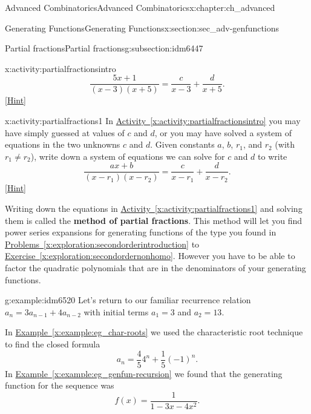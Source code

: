 \documentclass[oneside,10pt,]{book}
\newcommand{\terminology}[1]{\textbf{#1}}
\numberwithin{equation}{chapter}
\begin{document}
\begin{chapterptx}{Advanced Combinatorics}{}{Advanced Combinatorics}{}{}{x:chapter:ch_advanced}
\begin{sectionptx}{Generating Functions}{}{Generating Functions}{}{}{x:section:sec_adv-genfunctions}
\begin{subsectionptx}{Partial fractions}{}{Partial fractions}{}{}{g:subsection:idm6447}
\begin{activity}{}{x:activity:partialfractionsintro}
\begin{equation*}
\frac{5x+1}{(x-3)(x+5)} = \frac{c}{x-3} + \frac{d}{x+5}.
\end{equation*}
%
\space\hspace*{0pt}\hfill{\tiny\hyperlink{g:hint:idm6464-back}{[Hint]}}\end{activity}
\begin{activity}{}{x:activity:partialfractions1}%
In \hyperref[x:activity:partialfractionsintro]{Activity~\ref{x:activity:partialfractionsintro}} you may have simply guessed at values of \(c\) and \(d\), or you may have solved a system of equations in the two unknowns \(c\) and \(d\). Given constants \(a\), \(b\), \(r_1\), and \(r_2\) (with \(r_1\not= r_2\)), write down a system of equations we can solve for \(c\) and \(d\) to write%
\begin{equation*}
\frac{ax+b}{(x-r_1)(x-r_2)} = \frac{c}{x-r_1} + \frac{d}{x-r_2}\text{.}
\end{equation*}
%
\space\hspace*{0pt}\hfill{\tiny\hyperlink{g:hint:idm6499-back}{[Hint]}}\end{activity}
Writing down the equations in \hyperref[x:activity:partialfractions1]{Activity~\ref{x:activity:partialfractions1}} and solving them is called the \terminology{method of partial fractions}. This method will let you find power series expansions for generating functions of the type you found in \hyperref[x:exploration:secondorderintroduction]{Problems~\ref{x:exploration:secondorderintroduction}} to \hyperref[x:exploration:secondordernonhomo]{Exercise~\ref{x:exploration:secondordernonhomo}}. However you have to be able to factor the quadratic polynomials that are in the denominators of your generating functions.%
\begin{example}{}{g:example:idm6520}%
Let's return to our familiar recurrence relation \(a_n = 3a_{n-1} + 4a_{n-2}\) with initial terms \(a_1 = 3\) and \(a_2 = 13\).%
\par
In \hyperref[x:example:eg_char-roots]{Example~\ref{x:example:eg_char-roots}} we used the characteristic root technique to find the closed formula%
\begin{equation*}
a_n = \frac{4}{5} 4^n + \frac{1}{5} (-1)^n \text{.}
\end{equation*}
In \hyperref[x:example:eg_genfun-recursion]{Example~\ref{x:example:eg_genfun-recursion}} we found that the generating function for the sequence was%
\begin{equation*}
f(x) = \frac{1}{1-3x - 4x^2}\text{.}

\end{equation*}
\end{example}
\end{subsectionptx}
\end{sectionptx}
\end{chapterptx}
\end{document}
